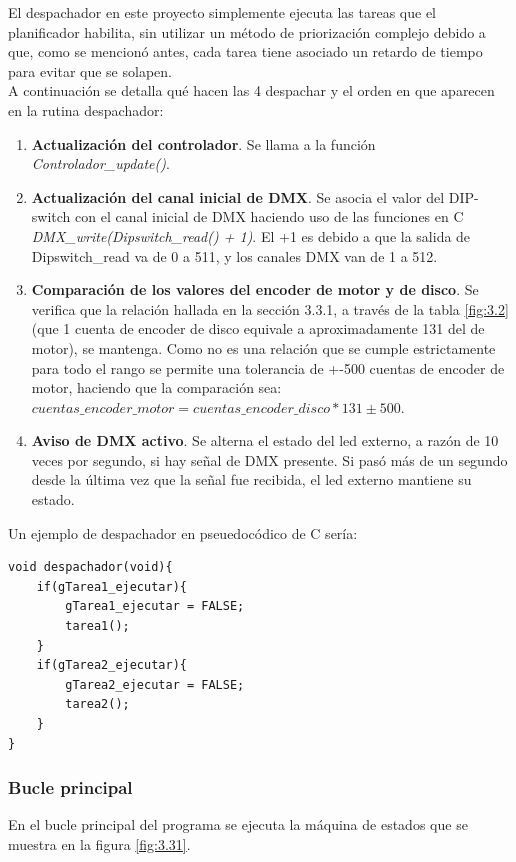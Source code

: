 El despachador en este proyecto simplemente ejecuta las tareas que el planificador habilita, sin utilizar un método de priorización complejo debido a que, como se mencionó antes, cada tarea tiene asociado un retardo de tiempo para evitar que se solapen.\\
A continuación se detalla qué hacen las 4 despachar y el orden en que aparecen en la rutina despachador:
\begin{enumerate}
	\item \textbf{Actualización del controlador}. Se llama a la función \textit{Controlador\_update()}.
	\item \textbf{Actualización del canal inicial de DMX}. Se asocia el valor del DIP-switch con el canal inicial de DMX haciendo uso de las funciones en C \textit{DMX\_write(Dipswitch\_read() + 1)}. El +1 es debido a que la salida de Dipswitch\_read va de 0 a 511, y los canales DMX van de 1 a 512.
	\item \textbf{Comparación de los valores del encoder de motor y de disco}. Se verifica que la relación hallada en la sección 3.3.1, a través de la tabla \ref{fig:3.2} (que 1 cuenta de encoder de disco equivale a aproximadamente 131 del de motor), se mantenga. Como no es una relación que se cumple estrictamente para todo el rango se permite una tolerancia de +-500 cuentas de encoder de motor, haciendo que la comparación sea: \( cuentas\_encoder\_motor = cuentas\_encoder\_disco*131 \pm 500 \).
	\item \textbf{Aviso de DMX activo}. Se alterna el estado del led externo, a razón de 10 veces por segundo, si hay señal de DMX presente. Si pasó más de un segundo desde la última vez que la señal fue recibida, el led externo mantiene su estado.
\end{enumerate}
Un ejemplo de despachador en pseuedocódico de C sería:
\begin{lstlisting}[style=CStyle]
void despachador(void){
	if(gTarea1_ejecutar){
		gTarea1_ejecutar = FALSE;
		tarea1();
	}
	if(gTarea2_ejecutar){
		gTarea2_ejecutar = FALSE;
		tarea2();
	}
}
\end{lstlisting}


\subsubsection{Bucle principal}
En el bucle principal del programa se ejecuta la máquina de estados que se muestra en la figura \ref{fig:3.31}. 


